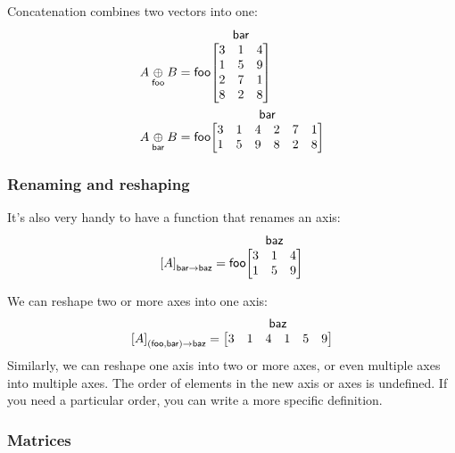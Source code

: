 \documentclass{article}
\makeatletter
\newcommand{\nmatrix}[3]{\name{#1}\begin{array}[b]{@{}c@{}}\name{#2}\\\begin{bmatrix}#3\end{bmatrix}\end{array}}
\makeatother
\begin{document}
Concatenation combines two vectors into one:
\begin{align*}
  A \ncat{foo} B &= \nmatrix{foo}{bar}{
    3 & 1 & 4 \\
    1 & 5 & 9 \\
    2 & 7 & 1 \\
    8 & 2 & 8
  } \\
  A \ncat{bar} B &= \nmatrix{foo}{bar}{
    3 & 1 & 4 & 2 & 7 & 1 \\
    1 & 5 & 9 & 8 & 2 & 8
  }
\end{align*}

\subsubsection{Renaming and reshaping}
\label{sec:reshaping}

It's also very handy to have a function that renames an axis:
\begin{equation*}
\nmov{bar}{baz}{A} = \nmatrix{foo}{baz}{
  3 & 1 & 4 \\
  1 & 5 & 9
}
\end{equation*}

We can reshape two or more axes into one axis:
\begin{equation*}
  \nmov{(foo,bar)}{baz}{A} = \nmatrix{}{baz}{
    3 & 1 & 4 & 1 & 5 & 9
  }
\end{equation*}
Similarly, we can reshape one axis into two or more axes, or even multiple axes into multiple axes.
The order of elements in the new axis or axes is undefined. If you need a particular order, you can write a more specific definition.

\subsubsection{Matrices}
\end{document}
